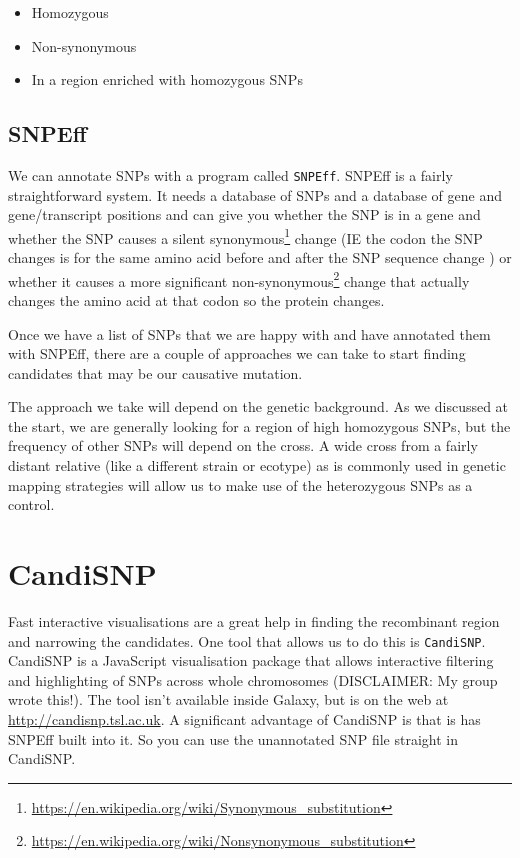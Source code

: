 \documentclass[12pt,]{book}
\providecommand{\tightlist}{%
  \setlength{\itemsep}{0pt}\setlength{\parskip}{0pt}}
\let\rmarkdownfootnote\footnote%
\def\footnote{\protect\rmarkdownfootnote}
\renewcommand{\href}[2]{#2\footnote{\url{#1}}}
\begin{document}
\begin{itemize}
\tightlist
\item
  Homozygous
\item
  Non-synonymous
\item
  In a region enriched with homozygous SNPs
\end{itemize}

\subsection{SNPEff}\label{snpeff}

We can annotate SNPs with a program called \texttt{SNPEff}. SNPEff
\citep{Cingolani:2012cz} is a fairly straightforward system. It needs a
database of SNPs and a database of gene and gene/transcript positions
and can give you whether the SNP is in a gene and whether the SNP causes
a silent
\href{https://en.wikipedia.org/wiki/Synonymous_substitution}{synonymous}
change (IE the codon the SNP changes is for the same amino acid before
and after the SNP sequence change ) or whether it causes a more
significant
\href{https://en.wikipedia.org/wiki/Nonsynonymous_substitution}{non-synonymous}
change that actually changes the amino acid at that codon so the protein
changes.

Once we have a list of SNPs that we are happy with and have annotated
them with SNPEff, there are a couple of approaches we can take to start
finding candidates that may be our causative mutation.

The approach we take will depend on the genetic background. As we
discussed at the start, we are generally looking for a region of high
homozygous SNPs, but the frequency of other SNPs will depend on the
cross. A wide cross from a fairly distant relative (like a different
strain or ecotype) as is commonly used in genetic mapping strategies
will allow us to make use of the heterozygous SNPs as a control.

\section{CandiSNP}\label{candisnp}

Fast interactive visualisations are a great help in finding the
recombinant region and narrowing the candidates. One tool that allows us
to do this is \texttt{CandiSNP}. CandiSNP \citep{Etherington:2014ba} is
a JavaScript visualisation package that allows interactive filtering and
highlighting of SNPs across whole chromosomes (DISCLAIMER: My group
wrote this!). The tool isn't available inside Galaxy, but is on the web
at \url{http://candisnp.tsl.ac.uk}. A significant advantage of CandiSNP
is that is has SNPEff built into it. So you can use the unannotated SNP
file straight in CandiSNP.
\end{document}
